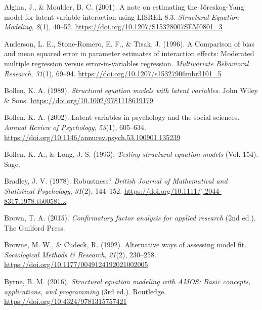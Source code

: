 \documentclass[
  man,mask]{apa6}
\newlength{\cslhangindent}
\newenvironment{CSLReferences}[2] %
 {\begin{list}{}{%
  \setlength{\itemindent}{0pt}
  \setlength{\leftmargin}{0pt}
  \setlength{\parsep}{0pt}
  \ifodd #1
   \setlength{\leftmargin}{\cslhangindent}
   \setlength{\itemindent}{-1\cslhangindent}
  \fi
  \setlength{\itemsep}{#2\baselineskip}}}
 {\end{list}}
\begin{document}
\label{refs}
\begin{CSLReferences}{1}{0}
Algina, J., \& Moulder, B. C. (2001). A note on estimating the {J{ö}reskog-Yang} model for latent variable interaction using {LISREL} 8.3. \emph{Structural Equation Modeling}, \emph{8}(1), 40--52. \url{https://doi.org/10.1207/S15328007SEM0801_3}

Anderson, L. E., Stone-Romero, E. F., \& Tisak, J. (1996). A {Comparison} of bias and mean squared error in parameter estimates of interaction effects: {Moderated} multiple regression versus error-in-variables regression. \emph{Multivariate Behavioral Research}, \emph{31}(1), 69--94. \url{https://doi.org/10.1207/s15327906mbr3101_5}

Bollen, K. A. (1989). \emph{Structural equation models with latent variables}. John Wiley \& Sons. \url{https://doi.org/10.1002/9781118619179}

Bollen, K. A. (2002). Latent variables in psychology and the social sciences. \emph{Annual Review of Psychology}, \emph{53}(1), 605--634. \url{https://doi.org/10.1146/annurev.psych.53.100901.135239}

Bollen, K. A., \& Long, J. S. (1993). \emph{Testing structural equation models} (Vol. 154). Sage.

Bradley, J. V. (1978). Robustness? \emph{British Journal of Mathematical and Statistical Psychology}, \emph{31}(2), 144--152. \url{https://doi.org/10.1111/j.2044-8317.1978.tb00581.x}

Brown, T. A. (2015). \emph{Confirmatory factor analysis for applied research} (2nd ed.). The Guilford Press.

Browne, M. W., \& Cudeck, R. (1992). Alternative ways of assessing model fit. \emph{Sociological Methods \& Research}, \emph{21}(2), 230--258. \url{https://doi.org/10.1177/0049124192021002005}

Byrne, B. M. (2016). \emph{Structural equation modeling with {AMOS}: {Basic} concepts, applications, and programming} (3rd ed.). Routledge. \url{https://doi.org/10.4324/9781315757421}


\end{CSLReferences}
\end{document}
